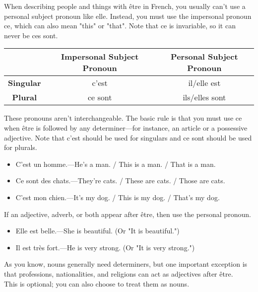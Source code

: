 When describing people and things with {\^e}tre in French, you usually can't use a personal subject pronoun like elle. Instead, you must use the impersonal pronoun ce, which can also mean "this" or "that". Note that ce is invariable, so it can never be ces sont.

\begin{center}\begin{tabular}{|c|c|c|}
\hline
                  & \textbf{Impersonal Subject Pronoun} & \textbf{Personal Subject Pronoun} \\ \hline
\textbf{Singular} & c'est                               & il/elle est                       \\ \hline
\textbf{Plural}   & ce sont                             & ils/elles sont                    \\ \hline
\end{tabular}\end{center}

These pronouns aren't interchangeable. The basic rule is that you must use ce when {\^e}tre is followed by any determiner---for instance, an article or a possessive adjective. Note that c'est should be used for singulars and ce sont should be used for plurals.

\begin{itemize}
  \item  C'est un homme.---He's a man. / This is a man. / That is a man.
  \item  Ce sont des chats.---They're cats. / These are cats. / Those are cats.
  \item  C'est mon chien.---It's my dog. / This is my dog. / That's my dog.
\end{itemize}

If an adjective, adverb, or both appear after {\^e}tre, then use the personal pronoun.

\begin{itemize}
  \item  Elle est belle.---She is beautiful. (Or "It is beautiful.")
  \item  Il est tr{\`e}s fort.---He is very strong. (Or "It is very strong.")
\end{itemize}

As you know, nouns generally need determiners, but one important exception is that professions, nationalities, and religions can act as adjectives after {\^e}tre. \\ 
This is optional; you can also choose to treat them as nouns.

